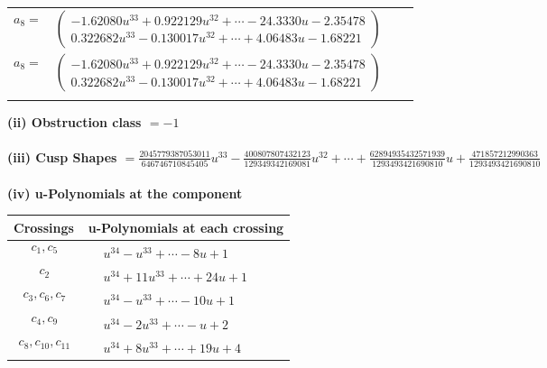 \documentclass[1p]{elsarticle_modified}
\theoremstyle{definition}
\begin{document}
\begin{tabular}{m{7pt} m{180pt} m{7pt} m{180pt} }
\flushright $a_{8}=$&$\begin{pmatrix}-1.62080 u^{33}+0.922129 u^{32}+\cdots-24.3330 u-2.35478\\0.322682 u^{33}-0.130017 u^{32}+\cdots+4.06483 u-1.68221\end{pmatrix}$\\ \flushright $a_{8}=$&$\begin{pmatrix}-1.62080 u^{33}+0.922129 u^{32}+\cdots-24.3330 u-2.35478\\0.322682 u^{33}-0.130017 u^{32}+\cdots+4.06483 u-1.68221\end{pmatrix}$\\&\end{tabular}
\flushleft \textbf{(ii) Obstruction class $= -1$}\\~\\
\flushleft \textbf{(iii) Cusp Shapes $= \frac{2045779387053011}{646746710845405} u^{33}-\frac{400807807432123}{129349342169081} u^{32}+\cdots+\frac{62894935432571939}{1293493421690810} u+\frac{471857212990363}{1293493421690810}$}\\~\\
\newpage\renewcommand{\arraystretch}{1}
\flushleft \textbf{(iv) u-Polynomials at the component}\newline \\
\begin{tabular}{m{50pt}|m{274pt}}
Crossings & \hspace{64pt}u-Polynomials at each crossing \\
\hline $$\begin{aligned}c_{1},c_{5}\end{aligned}$$&$\begin{aligned}
&u^{34}- u^{33}+\cdots-8 u+1
\end{aligned}$\\
\hline $$\begin{aligned}c_{2}\end{aligned}$$&$\begin{aligned}
&u^{34}+11 u^{33}+\cdots+24 u+1
\end{aligned}$\\
\hline $$\begin{aligned}c_{3},c_{6},c_{7}\end{aligned}$$&$\begin{aligned}
&u^{34}- u^{33}+\cdots-10 u+1
\end{aligned}$\\
\hline $$\begin{aligned}c_{4},c_{9}\end{aligned}$$&$\begin{aligned}
&u^{34}-2 u^{33}+\cdots- u+2
\end{aligned}$\\
\hline $$\begin{aligned}c_{8},c_{10},c_{11}\end{aligned}$$&$\begin{aligned}
&u^{34}+8 u^{33}+\cdots+19 u+4
\end{aligned}$\\
\hline
\end{tabular}\\~\\
\end{document}
